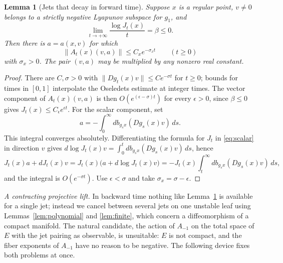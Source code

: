 \documentclass[12pt]{article}
\newtheorem{lemma}[theorem]{Lemma}
\theoremstyle{remark}
\begin{document}
\begin{lemma}[Jets that decay in forward time]\label{lem:forward}
Suppose \(x\) is a regular point, \(v\ne0\) belongs to a strictly
negative Lyapunov subspace for \(g_1\), and
\[
 \lim_{t\to+\infty}\frac{\log J_t(x)}t=\beta\le0.
\]
Then there is \(a=a(x,v)\) for which
\begin{equation}\label{eq:forward-decay}
 \|A_t(x)(v,a)\|\le C_x e^{-\sigma_x t}\qquad(t\ge0)
\end{equation}
with \(\sigma_x>0\).
The pair \((v,a)\) may be multiplied by any nonzero real constant.
\end{lemma}
\begin{proof}
There are \(C,\sigma>0\) with \(\|Dg_t(x)v\|\le Ce^{-\sigma t}\)
for \(t\ge0\); bounds for times in \([0,1]\) interpolate the
Oseledets estimate at integer times.
The vector component of \(A_t(x)(v,a)\) is then
\(O(e^{(\epsilon-\sigma)t})\) for every \(\epsilon>0\), since
\(\beta\le0\) gives \(J_t(x)\le C_\epsilon e^{\epsilon t}\).
For the scalar component, set
\begin{equation}\label{eq:stable-correction}
 a=-\int_0^\infty db_{g_sx}(Dg_s(x)v)\,ds .
\end{equation}
This integral converges absolutely.  Differentiating the formula for
\(J_t\) in \eqref{eq:scalar} in direction \(v\) gives
\(d\log J_t(x)v=\int_0^tdb_{g_sx}(Dg_s(x)v)\,ds\), hence
\[
 J_t(x)a+dJ_t(x)v=J_t(x)\bigl(a+d\log J_t(x)v\bigr)
       =-J_t(x)\int_t^\infty db_{g_sx}(Dg_s(x)v)\,ds,
\]
and the integral is \(O(e^{-\sigma t})\).
Use \(\epsilon<\sigma\) and take \(\sigma_x=\sigma-\epsilon\).
\end{proof}

\emph{A contracting projective lift.}
In backward time nothing like Lemma~\ref{lem:forward} is available
for a single jet; instead we cancel between several jets
on one unstable leaf using Lemmas~\ref{lem:polynomial} and
\ref{lem:finite}, which concern a diffeomorphism of a compact
manifold.  The natural candidate, the action of \(A_{-1}\) on the
total space of \(E\) with the jet pairing as observable, is
unsuitable: \(E\) is not compact, and the fiber exponents of
\(A_{-1}\) have no reason to be negative.  The following device fixes
both problems at once.
\end{document}
